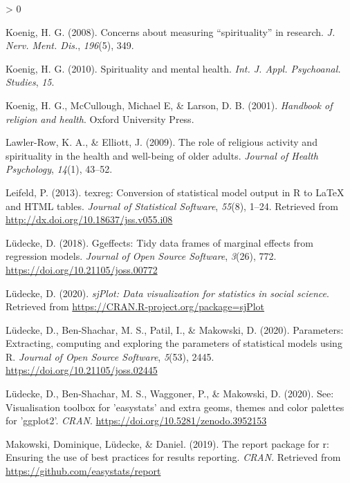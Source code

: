 \documentclass[
  english,
  man,floatsintext]{apa6}
\newlength{\cslhangindent}
\newenvironment{CSLReferences}[2] %
 {%
  \setlength{\parindent}{0pt}
  \ifodd #1 \everypar{\setlength{\hangindent}{\cslhangindent}}\ignorespaces\fi
  \ifnum #2 > 0
  \setlength{\parskip}{#2\baselineskip}
  \fi
 }%
 {}
\begin{document}
\begin{CSLReferences}{1}{0}
\leavevmode\hypertarget{ref-Koenig2008-lv}{}%
Koenig, H. G. (2008). Concerns about measuring {``spirituality''} in research. \emph{J. Nerv. Ment. Dis.}, \emph{196}(5), 349.

\leavevmode\hypertarget{ref-Koenig2010-gk}{}%
Koenig, H. G. (2010). Spirituality and mental health. \emph{Int. J. Appl. Psychoanal. Studies}, \emph{15}.

\leavevmode\hypertarget{ref-Koenig2001-ow}{}%
Koenig, H. G., McCullough, Michael E, \& Larson, D. B. (2001). \emph{Handbook of religion and health}. Oxford University Press.

\leavevmode\hypertarget{ref-lawler2009role}{}%
Lawler-Row, K. A., \& Elliott, J. (2009). The role of religious activity and spirituality in the health and well-being of older adults. \emph{Journal of Health Psychology}, \emph{14}(1), 43--52.

\leavevmode\hypertarget{ref-R-texreg}{}%
Leifeld, P. (2013). {texreg}: Conversion of statistical model output in {R} to {LaTeX} and {HTML} tables. \emph{Journal of Statistical Software}, \emph{55}(8), 1--24. Retrieved from \url{http://dx.doi.org/10.18637/jss.v055.i08}

\leavevmode\hypertarget{ref-R-ggeffects}{}%
Lüdecke, D. (2018). Ggeffects: Tidy data frames of marginal effects from regression models. \emph{Journal of Open Source Software}, \emph{3}(26), 772. \url{https://doi.org/10.21105/joss.00772}

\leavevmode\hypertarget{ref-R-sjPlot}{}%
Lüdecke, D. (2020). \emph{sjPlot: Data visualization for statistics in social science}. Retrieved from \url{https://CRAN.R-project.org/package=sjPlot}

\leavevmode\hypertarget{ref-R-parameters}{}%
Lüdecke, D., Ben-Shachar, M. S., Patil, I., \& Makowski, D. (2020). Parameters: Extracting, computing and exploring the parameters of statistical models using {R}. \emph{Journal of Open Source Software}, \emph{5}(53), 2445. \url{https://doi.org/10.21105/joss.02445}

\leavevmode\hypertarget{ref-R-see}{}%
Lüdecke, D., Ben-Shachar, M. S., Waggoner, P., \& Makowski, D. (2020). See: Visualisation toolbox for 'easystats' and extra geoms, themes and color palettes for 'ggplot2'. \emph{CRAN}. \url{https://doi.org/10.5281/zenodo.3952153}

\leavevmode\hypertarget{ref-R-report}{}%
Makowski, Dominique, Lüdecke, \& Daniel. (2019). The report package for r: Ensuring the use of best practices for results reporting. \emph{CRAN}. Retrieved from \url{https://github.com/easystats/report}


\end{CSLReferences}
\end{document}
